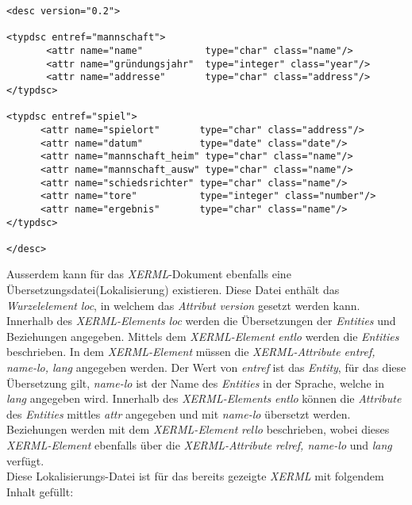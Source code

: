 \begin{verbatim}
<desc version="0.2">

<typdsc entref="mannschaft">
       <attr name="name"           type="char" class="name"/>
       <attr name="gründungsjahr"  type="integer" class="year"/>
       <attr name="addresse"       type="char" class="address"/>
</typdsc>

<typdsc entref="spiel">
      <attr name="spielort"       type="char" class="address"/>
      <attr name="datum"          type="date" class="date"/>
      <attr name="mannschaft_heim" type="char" class="name"/>
      <attr name="mannschaft_ausw" type="char" class="name"/>
      <attr name="schiedsrichter" type="char" class="name"/>
      <attr name="tore"           type="integer" class="number"/>
      <attr name="ergebnis"       type="char" class="name"/>
</typdsc>

</desc>

\end{verbatim}
\pra
\noindent
Ausserdem kann für das \textit{XERML}-Dokument ebenfalls eine Übersetzungsdatei(Lokalisierung) existieren. Diese Datei enthält das  \textit{Wurzelelement} \textit{loc}, in welchem das \textit{Attribut} \textit{version} gesetzt werden kann. Innerhalb des \textit{XERML-Elements} \textit{loc} werden die Übersetzungen der \textit{Entities} und Beziehungen angegeben. Mittels dem \textit{XERML-Element} \textit{entlo} werden die \textit{Entities} beschrieben. In dem \textit{XERML-Element} müssen die \textit{XERML-Attribute} \textit{entref, name-lo, lang} angegeben werden. Der Wert von \textit{entref} ist das \textit{Entity}, für das diese Übersetzung gilt, \textit{name-lo} ist der Name des \textit{Entities} in der Sprache, welche in \textit{lang} angegeben wird. Innerhalb des \textit{XERML-Elements} \textit{entlo} können die \textit{Attribute} des \textit{Entities} mittles \textit{attr} angegeben und mit \textit{name-lo} übersetzt werden.
Beziehungen werden mit dem \textit{XERML-Element} \textit{rello} beschrieben, wobei dieses \textit{XERML-Element} ebenfalls über die \textit{XERML-Attribute} \textit{relref, name-lo} und \textit{lang} verfügt.
\\

\noindent
Diese Lokalisierungs-Datei ist für das bereits gezeigte \textit{XERML} mit folgendem Inhalt gefüllt:

